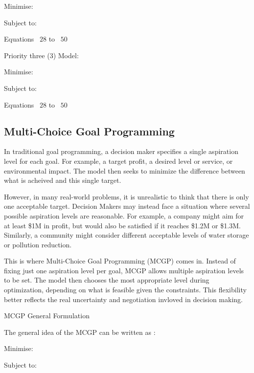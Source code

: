 Minimise:
        \EqLGPObjectivePriorityTwoThirtySix

Subject to:
         \begin{center}
        Equations ~$28$ to ~$50$
        \end{center}  
        \EqLGPObjectivePriorityOneConstraintThirtyEight

Priority three (3) Model:

Minimise:
        \EqLGPObjectivePriorityThreeThirtySeven

Subject to:
        \begin{center}
        Equations ~$28$ to ~$50$
        \end{center}   
        \EqLGPObjectivePriorityOneConstraintThirtyEight
        \EqLGPObjectivePriorityTwoConstraintThirtyNine

\subsection{Multi-Choice Goal Programming}
In traditional goal programming, a decision maker specifies a single aspiration level for each goal. For example, a target profit, a desired level or service, or environmental impact. The model then seeks to minimize the difference between what is acheived and this single target.

However, in many real-world problems, it is unrealistic to think that there is only one acceptable target. Decision Makers may instead face a situation where several possible aspiration levels are reasonable. For example, a company might aim for at least \$1M in profit, but would also be satisfied if it reaches \$1.2M or \$1.3M. Similarly, a community might consider different acceptable levels of water storage or pollution reduction.

This is where Multi-Choice Goal Programming (MCGP) comes in. Instead of fixing just one aspiration level per goal, MCGP allows multiple aspiration levels to be set. The model then chooses the most appropriate level during optimization, depending on what is feasible given the constraints. This flexibility better reflects the real uncertainty and negotiation invloved in decision making.

MCGP General Formulation

The general idea of the MCGP can be written as \cite{CHANG2007}:

Minimise:
       \EqMCGPObjectiveFourty

Subject to:
       \EqMCGPConstraintFourtyOne

